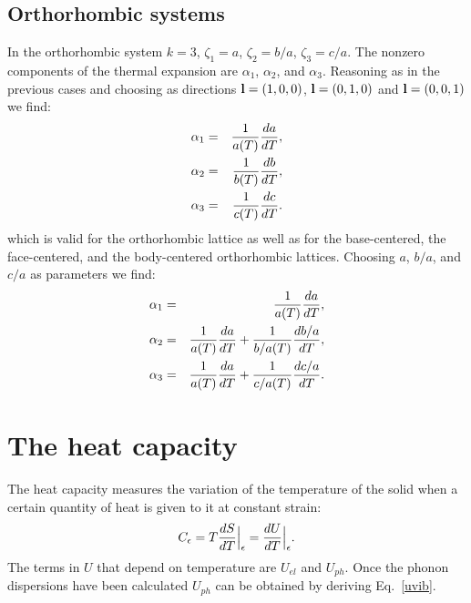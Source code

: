 \documentclass[12pt,a4paper]{article}
\begin{document}
\subsection{\color{web-blue}Orthorhombic systems}
In the orthorhombic system $k=3$, $\zeta_1=a$, $\zeta_2=b/a$, 
$\zeta_3=c/a$. The nonzero components of the thermal expansion are 
$\alpha_{1}$, $\alpha_{2}$, and $\alpha_{3}$. 
Reasoning as in the previous cases and choosing as directions
${\bf l}=(1,0,0)$, ${\bf l}=(0,1,0)$ and ${\bf l}=(0,0,1)$ we find:  
\begin{eqnarray}
\alpha_{1} &=&  {1\over a(T) } {d a \over dT}, \\ 
\alpha_{2} &=&  {1\over b(T) } {d b \over dT}, \\
\alpha_{3} &=&  {1\over c(T) } {d c \over dT}.
\end{eqnarray}
which is valid for the orthorhombic lattice as well as for the
base-centered, the face-centered, and the body-centered orthorhombic lattices.
Choosing $a$, $b/a$, and $c/a$ as parameters we find:
\begin{eqnarray}
\alpha_1 &=& {1\over a(T)} {d a \over dT}, \\
\alpha_2 &=& {1\over a(T)} {da \over d T}  + {1\over b/a(T)} {d b/a \over dT}, \\
\alpha_3 &=& {1\over a(T)} {da \over d T}  + {1\over c/a(T)} {d c/a \over dT}.
\end{eqnarray}



\newpage
\section{\color{coral}The heat capacity}
The heat capacity measures the variation of the temperature of the solid
when a certain quantity of heat is given to it at constant strain:
\begin{equation}
C_\epsilon= T {d S \over dT}\Big|_\epsilon = { d U \over d T}\Big|_\epsilon.
\end{equation}
The terms in $U$ that depend on temperature are $U_{el}$ and $U_{ph}$. 
Once the phonon dispersions 
have been calculated $U_{ph}$ can be obtained by deriving Eq.~\ref{uvib}.
\end{document}
